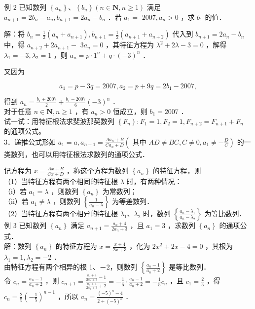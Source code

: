 \documentclass[10pt]{article}
\begin{document}
例 2 已知数列 \(\left\{a_{n}\right\} 、\left\{b_{n}\right\}(n \in \mathbf{N}, n \geqslant 1)\) 满足 \(a_{n+1}=2 b_{n}-a_{n}, b_{n+1}=2 a_{n}-b_{n}\) ．若 \(a_{1}=\) \(2007, a_{n}>0\) ，求 \(b_{1}\) 的值．

解：将 \(b_{n}=\frac{1}{2}\left(a_{n}+a_{n+1}\right), b_{n+1}=\frac{1}{2}\left(a_{n+1}+a_{n+2}\right)\) 代入到 \(b_{n+1}=2 a_{n}-b_{n}\) 中，得 \(a_{n+2}+2 a_{n+1}-\) \(3 a_{n}=0\) ，其特征方程为 \(\lambda^{2}+2 \lambda-3=0\) ，解得 \(\lambda_{1}=-3, \lambda_{2}=1\) ，则 \(a_{n}=p \cdot 1^{n}+q \cdot(-3)^{n}\) ．

又因为

\[
a_{1}=p-3 q=2007, a_{2}=p+9 q=2 b_{1}-2007,
\]

得到 \(a_{n}=\frac{b_{1}+2007}{2}+\frac{b_{1}-2007}{6}(-3)^{n}\) ．\\
对于任意 \(n \in \mathbf{N}, n \geqslant 1\) ，有 \(a_{n}>0\) 恒成立，则 \(b_{1}=2007\) ．\\
试一试：用特征根法求斐波那契数列 \(\left\{F_{n}\right\}: F_{1}=1, F_{2}=1, F_{n+2}=F_{n+1}+F_{n}\) 的通项公式。\\
3．递推公式形如 \(a_{1}=a, a_{n+1}=\frac{A a_{n}+B}{C a_{n}+D}\left(\right.\) 其中 \(\left.A D \neq B C, C \neq 0, a_{1} \neq-\frac{D}{C}\right)\) 的一类数列，也可以用特征根法求数列的通项公式．

记方程为 \(x=\frac{A x+B}{C x+D}\) ，称这个方程为数列 \(\left\{a_{n}\right\}\) 的特征方程，则\\
（1）当特征方程有两个相同的特征根 \(\lambda\) 时，有两种情况：\\
（i）若 \(a_{1}=\lambda\) ，则数列 \(\left\{a_{n}\right\}\) 为常数列；\\
（ii）若 \(a_{1} \neq \lambda\) ，则数列 \(\left\{\frac{1}{a_{n}-\lambda}\right\}\) 为等差数列．\\
（2）当特征方程有两个相异的特征根 \(\lambda_{1} 、 \lambda_{2}\) 时，数列 \(\left\{\frac{a_{n}-\lambda_{1}}{a_{n}-\lambda_{2}}\right\}\) 为等比数列．\\
例 3 已知数列 \(\left\{a_{n}\right\}\) 满足 \(a_{n+1}=\frac{a_{n}+4}{2 a_{n}+3}\) ，且 \(a_{1}=3\) ，求数列 \(\left\{a_{n}\right\}\) 的通项公式．\\
解：数列 \(\left\{a_{n}\right\}\) 的特征方程为 \(x=\frac{x+4}{2 x+3}\) ，化为 \(2 x^{2}+2 x-4=0\) ，其根为 \(\lambda_{1}=1, \lambda_{2}=-2\) ．\\
由特征方程有两个相异的根 1、－2，则数列 \(\left\{\frac{a_{n}-1}{a_{n}+2}\right\}\) 是等比数列．\\
令 \(c_{n}=\frac{a_{n}-1}{a_{n}+2}\) ，则 \(c_{n+1}=\frac{\frac{a_{n}+4}{2 a_{n}+3}-1}{\frac{a_{n}+4}{2 a_{n}+3}+2}=-\frac{1}{5} \cdot \frac{a_{n}-1}{a_{n}+2}=-\frac{1}{5} c_{n}\) ，且 \(c_{1}=\frac{2}{5}\) ，得 \(c_{n}=\frac{2}{5}\left(-\frac{1}{5}\right)^{n-1}\) ，所以 \(a_{n}=\frac{(-5)^{n}-4}{2+(-5)^{n}}\) ．
\end{document}

